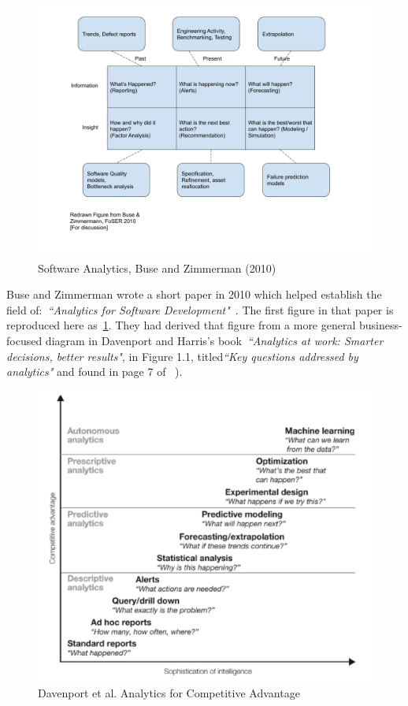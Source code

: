 \begin{figure}[!htbp]
    \centering
    \includegraphics[width=14cm]{images/Buse_and_Zimmermann_2010_figure.png}
    \caption{Software Analytics, Buse and Zimmerman (2010)}
    \label{fig:software_analytics_buse_and_zimmerman_2010}
\end{figure}

Buse and Zimmerman wrote a short paper in 2010 which helped establish the field of:~\emph{``Analytics for Software Development"}~\citep{buse_analytics_2010}. The first figure in that paper is reproduced here as~\ref{fig:software_analytics_buse_and_zimmerman_2010}. They had derived that figure from a more general business-focused diagram in Davenport and Harris's book~\emph{``Analytics at work: Smarter decisions, better results"},  in Figure 1.1, titled\emph{``Key questions addressed by analytics"} and found in page 7 of ~\citep{davenport2010analytics_at_work}).

\begin{figure}[!htbp]
    \centering
    \includegraphics[width=14cm]{images/hbr/davenport-et-al-competing-on-analytics-2017-competitive-advantage.png}
    \caption{Davenport et al. Analytics for Competitive Advantage}
    \label{fig:davenport-analytics-for-competitive-advantage}
\end{figure}


